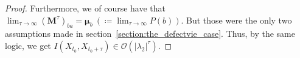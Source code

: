 \documentclass[../../main.tex]{subfiles}
\begin{document}
\begin{proof}
        Furthermore, we of course have that $\lim_{\tau \to \infty} (\bm{M}^\tau)_{ba} = \bm{\mu}_b \ (\coloneqq \lim_{\tau \to \infty} P(b))$. But those were the only two assumptions made in section~\ref{section:the_defectvie_case}. Thus, by the same logic, we get $I(X_{t_0}, X_{t_0 + \tau}) \in \mathcal{O}(|\lambda_2|^\tau)$.
    \end{proof}
\end{document}
